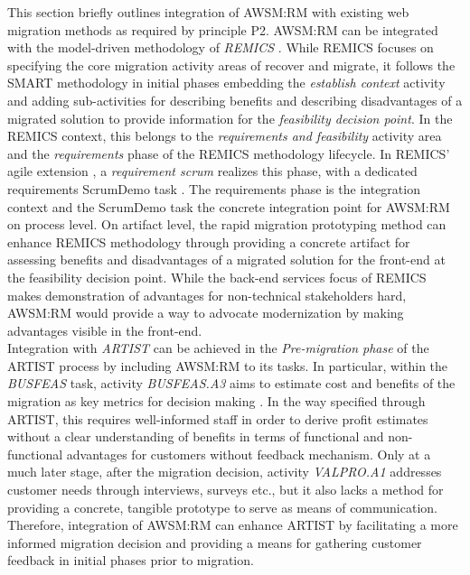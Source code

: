 This section briefly outlines integration of AWSM:RM with existing web migration methods as required by principle P2.
AWSM:RM can be integrated with the model-driven methodology of \emph{REMICS} \autocite{Mohagheghi2011REMICS}.
While REMICS focuses on specifying the core migration activity areas of recover and migrate, it follows the SMART methodology \autocite{Lewis2008SMART} in initial phases \autocite{Mohagheghi2011REMICS,REMICS2013Handbook} embedding the \emph{establish context} activity \autocite{Lewis2008SMART} and adding sub-activities for describing benefits and describing disadvantages of a migrated solution \autocite{Mohagheghi2011REMICS} to provide information for the \emph{feasibility decision point}.
In the REMICS context, this belongs to the \emph{requirements and feasibility} activity area and the \emph{requirements} phase of the REMICS methodology lifecycle.
In REMICS' agile extension \autocite{Krasteva2013REMICSAgile}, a \emph{requirement scrum} realizes this phase, with a dedicated requirements ScrumDemo task \autocite{REMICS2013Handbook}.
The requirements phase is the integration context and the ScrumDemo task the concrete integration point for AWSM:RM on process level.
On artifact level, the rapid migration prototyping method can enhance REMICS methodology through providing a concrete artifact for assessing benefits and disadvantages of a migrated solution for the front-end at the feasibility decision point.
While the back-end services focus of REMICS makes demonstration of advantages for non-technical stakeholders hard, AWSM:RM would provide a way to advocate modernization by making advantages visible in the front-end.\\
Integration with \emph{ARTIST} \autocite{ARTIST2014Methodology} can be achieved in the \emph{Pre-migration phase} of the ARTIST process by including AWSM:RM to its tasks.
In particular, within the \emph{BUSFEAS} task, activity \emph{BUSFEAS.A3} aims to estimate cost and benefits of the migration as key metrics for decision making \autocite{ARTIST2014Methodology}.
In the way specified through ARTIST, this requires well-informed staff in order to derive profit estimates without a clear understanding of benefits in terms of functional and non-functional advantages for customers without feedback mechanism.
Only at a much later stage, after the migration decision, activity \emph{VALPRO.A1} addresses customer needs through interviews, surveys etc., but
it also lacks a method for providing a concrete, tangible prototype to serve as means of communication.
Therefore, integration of AWSM:RM can enhance ARTIST by facilitating a more informed migration decision and providing a means for gathering customer feedback in initial phases prior to migration.

